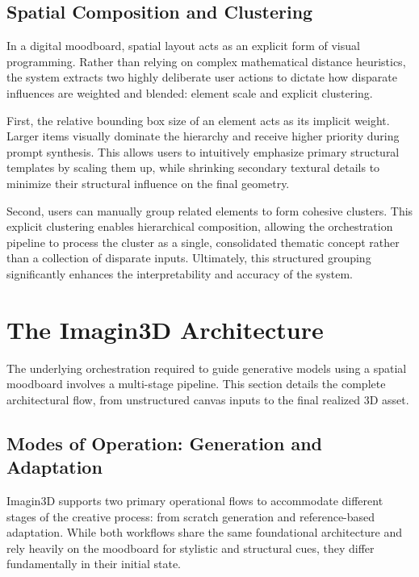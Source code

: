 \subsection{Spatial Composition and Clustering}

In a digital moodboard, spatial layout acts as an explicit form of visual programming. Rather than relying on complex mathematical distance heuristics, the system extracts two highly deliberate user actions to dictate how disparate influences are weighted and blended: element scale and explicit clustering. 

First, the relative bounding box size of an element acts as its implicit weight. Larger items visually dominate the hierarchy and receive higher priority during prompt synthesis. This allows users to intuitively emphasize primary structural templates by scaling them up, while shrinking secondary textural details to minimize their structural influence on the final geometry. 

Second, users can manually group related elements to form cohesive clusters. This explicit clustering enables hierarchical composition, allowing the orchestration pipeline to process the cluster as a single, consolidated thematic concept rather than a collection of disparate inputs. Ultimately, this structured grouping significantly enhances the interpretability and accuracy of the system.

\section{The Imagin3D Architecture}

The underlying orchestration required to guide generative models using a spatial moodboard involves a multi-stage pipeline. This section details the complete architectural flow, from unstructured canvas inputs to the final realized 3D asset.

\subsection{Modes of Operation: Generation and Adaptation}

Imagin3D supports two primary operational flows to accommodate different stages of the creative process: from scratch generation and reference-based adaptation. While both workflows share the same foundational architecture and rely heavily on the moodboard for stylistic and structural cues, they differ fundamentally in their initial state. 

